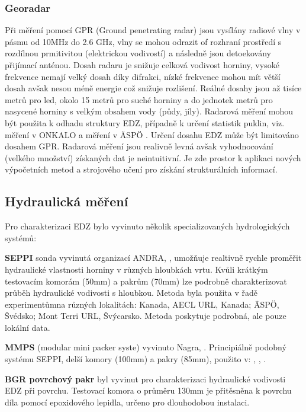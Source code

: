 \documentclass{article}
\begin{document}
\subsubsection{Georadar}
Při měření pomocí GPR (Ground penetrating radar) jsou vysílány radiové vlny v pásmu od 10MHz do 2.6 GHz, vlny se mohou odrazit of rozhraní prostředí s rozdílnou prmitivitou (elektrickou vodivostí) a následně jsou detoekovány přijímací anténou. Dosah radaru je snižuje celková vodivost horniny, vysoké frekvence nemají velký dosah díky difrakci, nízké frekvence mohou mít větší dosah avšak nesou méně energie což snižuje rozlišení. Reálné dosahy jsou až tisíce metrů pro led, okolo 15 metrů pro suché horniny a do jednotek metrů pro nasycené horniny s velkým obsahem vody (půdy, jíly). 
Radarová měření mohou být použita k odhadu struktury EDZ, případně k určení statistik puklin, viz. měření v ONKALO \cite{Silvast2008} a měření v \"ASP\"O \cite{Walton2015}. Určení dosahu EDZ může být limitováno dosahem GPR.
Radarová měření jsou realivně levná avšak vyhodnocování (velkého množství) získaných dat je neintuitivní. Je zde prostor k aplikaci nových výpočetních metod a strojového učení pro získání strukturálních informací.   


\subsection{Hydraulická měření}
Pro charakterizaci EDZ bylo vyvinuto několik specializovaných hydrologických systémů:

{\bf SEPPI} sonda vyvinutá organizací ANDRA, \cite{Bauer1995}, umožňuje realtivně rychle proměřit hydraulické vlastnosti horniny v různých hloubkách vrtu. Kvůli krátkým testovacím komorám (50mm)
a pakrům (70mm) lze podrobně charakterizovat průběh hydraulické vodivosti s hloubkou. Metoda byla použita v řadě experimentůmna různých lokalitách: Kanada,  \cite{Souley2001} AECL URL, Kanada;
 \cite{Emsley1997} \"ASP\"O, Švédsko; \cite{Bossart2002} Mont Terri URL, Švýcarsko. Metoda poskytuje podrobná, ale pouze lokální data.

{\bf MMPS } (modular mini packer syste) vyvinuto Nagra, \cite{Frieg1999}. Principiálně podobný systému SEPPI, delší komory (100mm) a pakry (85mm), použito v: \cite{Marschall1999}, \cite{Martin2004}, \cite{Matray2007}.

{\bf BGR povrchový pakr} \cite{Marschall1999} byl vyvinut pro charakterizaci hydraulické vodivosti EDZ při povrchu. Testovací komora o průměru 130mm je přitěsněna k povrchu díla pomocí epoxidového lepidla, určeno pro dlouhodobou instalaci.
\end{document}
